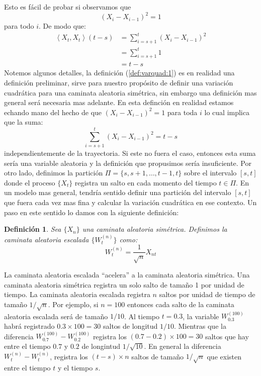 \documentclass{extreport}
\makeatletter
\theoremstyle{definicion}
\newtheorem{definition}{Definición}[chapter]
\theoremstyle{propiedad}
\theoremstyle{teorema}
\renewenvironment{proof}[1][\proofname]{\par
    \pushQED{\qed}%
    \normalfont \topsep6\p@\@plus6\p@\relax
    \trivlist
    \item\relax
            {\itshape
        #1\@addpunct{.}}\hspace\labelsep\ignorespaces
}{%
    \popQED\endtrivlist\@endpefalse
}
\makeatother
\begin{document}
\begin{proof}
    Esto es fácil de probar si observamos que 
    $$
    \left(X_{i} - X_{i-1}\right)^2  = 1
    $$
    para todo $i$. De modo que:
    \begin{equation*}
    \begin{split}
        \left\langle X_t, X_t\right\rangle(t-s) & = \sum_{i=s+1}^t \left(X_{i} - X_{i-1}\right)^2 \\
                                                & = \sum_{i=s+1}^t 1 \\
                                                & = t-s
    \end{split} 
    \end{equation*}
\end{proof}
Notemos algunos detalles, la definición (\ref{def:varquad:1}) es en realidad una definición preliminar, sirve para nuestro propósito de definir una variación cuadrática para una caminata aleatoria simétrica, sin embargo una definición mas general será necesaria mas adelante. En esta definción en realidad estamos echando mano del hecho de que $(X_i-X_{i-1})^2 = 1$ para toda $i$ lo cual implica que la suma:
$$
\sum_{i=s+1}^t \left(X_{i} - X_{i-1}\right)^2  = t-s
$$
independientemente de la trayectoria. Si este no fuera el caso, entonces esta suma sería una variable aleatoria y la definición que propusimos sería insuficiente.  Por otro lado,  definimos la partición $\Pi = \{s, s+1, \ldots, t-1, t\}$ sobre el intervalo $[s,t]$ donde el proceso $\{X_t\}$ registra un salto en cada momento del tiempo $t\in \Pi$. En un modelo mas general, tendría sentido definir una partición del intervalo $[s, t]$ que fuera cada vez mas fina y calcular la variación cuadrática en ese contexto. Un paso en este sentido lo damos con la siguiente definición: 
\begin{definition}
    Sea $\{X_n\}$ una caminata aleatoria simétrica. Definimos la \emph{caminata aleatoria escalada} $\{W^{(n)}_t\}$ como:
    \begin{equation}
        W^{(n)}_t = \frac{1}{\sqrt{n}} X_{nt} 
        \label{eq:scaled_rw}
    \end{equation}
\end{definition}
La caminata aleatoria escalada  ``acelera'' a la caminata aleatoria simétrica. Una caminata aleatoria simétrica registra un solo salto de tamaño 1 por unidad de tiempo. La caminata aleatoria escalada registra $n$ saltos por unidad de tiempo de tamaño $1/\sqrt{n}$. Por ejemplo, si $n= 100$ entonces cada salto de la caminata aleatoria escalada será de tamaño $1/10$. Al tiempo $t = 0.3$, la variable $W_{0.3}^{(100)}$ habrá registrado $0.3\times 100 = 30$ saltos de longitud $1/10$. Mientras que la diferencia $W^{(100)}_{0.7} - W^{(100)}_{0.2}$ registra los $(0.7-0.2)\times 100 = 30$ saltos que hay entre el tiempo $0.7$ y $0.2$ de longintud $1/\sqrt{10}$. En general la diferencia $W^{(n)}_t-W^{(n)}_t$, registra los $(t-s)\times n$ saltos de tamaño $1/\sqrt{n}$ que existen entre el tiempo $t$ y el tiempo $s$.
\end{document}
